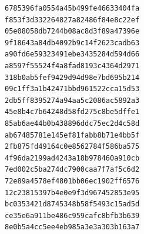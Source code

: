 \documentclass[12pt,a4paper]{article}
\begin{document}
\begin{lstlisting}
6785396fa0554a45b499fe46633404fa
f853f3d332264827a82486f84e8c22ef
05e08058db7244b08ac8d3f89a47396e
9f18643a84db4092b9c14f2623cadb63
a90fd6e59323491ebe3435284d594d66
a8597f55524f4a8fad8193c4364d2971
318b0ab5fef9429d94d98e7bd695b214
09c1ff3a1b42471bbd961522cca15d53
2db5ff8395274a94aa5c2086ac5892a3
45e8b4c7b64248d58fd275c8be5dffe1
85ab6ae44b0b438896ddc75ec2d4c58d
ab67485781e145ef81fabb8b71e4bb5f
2fb875fd49164c0e8562784f586ba575
4f96da2199ad4243a18b978460a910cb
7ed002c5ba274dc7900caa7f7af5c6d2
72e89a4578ef4801bb06ec1902ff6576
12c23815397b4e0e9f3d967452853e95
bc0353421d8745348b58f5493c15ad5d
ce35e6a911be486c959cafc8bfb3b639
8e0b5a4cc5ee4eb985a3e3a303b163a7
\end{lstlisting}
\end{document}

